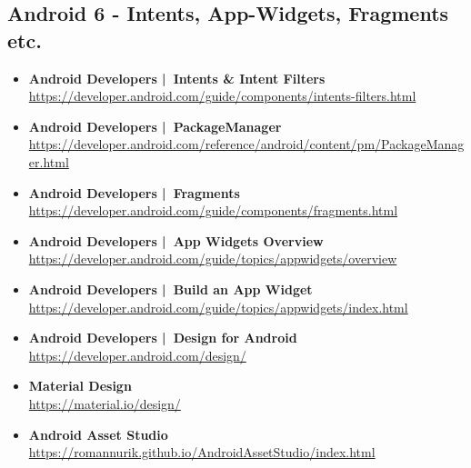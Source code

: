 \documentclass[a4paper]{article}
\begin{document}
		\subsection{Android 6 - Intents, App-Widgets, Fragments etc.}
		
		\begin{itemize}
			
			\item \textbf{Android Developers | Intents \& Intent Filters}\\
			\href{https://developer.android.com/guide/components/intents-filters.html}
			{https://developer.android.com/guide/components/intents-filters.html}
			
			\item \textbf{Android Developers | PackageManager}\\
			\href{https://developer.android.com/reference/android/content/pm/PackageManager.html}
			{https://developer.android.com/reference/android/content/pm/PackageManager.html}
			
			\item \textbf{Android Developers | Fragments}\\
			\href{https://developer.android.com/guide/components/fragments.html}
			{https://developer.android.com/guide/components/fragments.html}
			
			\item \textbf{Android Developers | App Widgets Overview}\\
			\href{https://developer.android.com/guide/topics/appwidgets/overview}
			{https://developer.android.com/guide/topics/appwidgets/overview}
			
			\item \textbf{Android Developers | Build an App Widget}\\
			\href{https://developer.android.com/guide/topics/appwidgets/index.html}
			{https://developer.android.com/guide/topics/appwidgets/index.html}
			
			\item \textbf{Android Developers | Design for Android}\\
			\href{https://developer.android.com/design/}
			{https://developer.android.com/design/}
			
			\item \textbf{Material Design}\\
			\href{https://material.io/design/}
			{https://material.io/design/}
			
			\item \textbf{Android Asset Studio}\\
			\href{https://romannurik.github.io/AndroidAssetStudio/index.html}
			{https://romannurik.github.io/AndroidAssetStudio/index.html}
			

\end{itemize}
\end{document}
